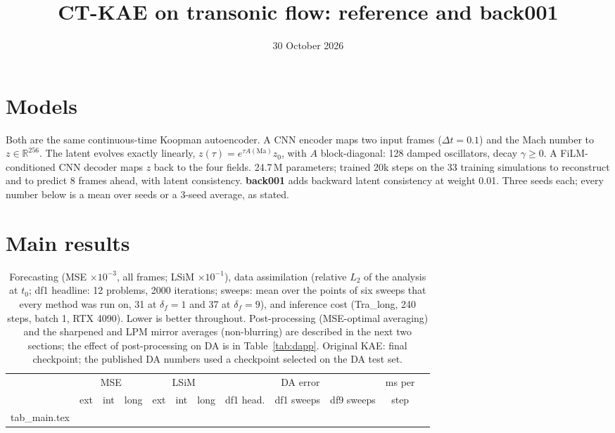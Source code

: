 \documentclass[10pt]{article}
\title{\textbf{CT-KAE on transonic flow: reference and back001}}
\date{30 October 2026}
\author{}
\begin{document}
\maketitle
\vspace{-2.5em}

\section*{Models}
Both are the same continuous-time Koopman autoencoder. A CNN encoder maps two input frames
($\Delta t=0.1$) and the Mach number to $z\in\mathbb R^{256}$. The latent evolves exactly linearly,
$z(\tau)=e^{\tau A(\mathrm{Ma})}z_0$, with $A$ block-diagonal: 128 damped oscillators, decay
$\gamma\ge0$. A FiLM-conditioned CNN decoder maps $z$ back to the four fields. 24.7\,M parameters;
trained 20k steps on the 33 training simulations to reconstruct and to predict 8 frames ahead,
with latent consistency. \textbf{back001} adds backward latent consistency at weight 0.01. Three
seeds each; every number below is a mean over seeds or a 3-seed average, as stated.

\section*{Main results}
\begin{table}[!htbp]
\centering\scriptsize
\caption{Forecasting (MSE $\times10^{-3}$, all frames; LSiM $\times10^{-1}$), data assimilation
(relative $L_2$ of the analysis at $t_0$; df1 headline: 12 problems, 2000 iterations; sweeps: mean
over the points of six sweeps that every method was run on, 31 at $\delta_f=1$ and 37 at
$\delta_f=9$), and inference cost (Tra\_long,
240 steps, batch 1, RTX 4090). Lower is better throughout. Post-processing (MSE-optimal averaging)
and the sharpened and LPM mirror averages (non-blurring) are described in the next two sections; the effect
of post-processing on DA is in Table~\ref{tab:dapp}. Original KAE: final checkpoint; the published DA numbers used a checkpoint selected on the
DA test set.}
\label{tab:main}
\setlength{\tabcolsep}{3.5pt}
\begin{tabular}{lccccccccccc}
\toprule
 & \multicolumn{3}{c}{MSE} & \multicolumn{3}{c}{LSiM} & \multicolumn{3}{c}{DA error} & ms per\\
\cmidrule(lr){2-4}\cmidrule(lr){5-7}\cmidrule(lr){8-10}
 & ext & int & long & ext & int & long & df1 head. & df1 sweeps & df9 sweeps & step\\
\midrule
{} tab_main.tex
\bottomrule
\end{tabular}
\end{table}
\end{document}
